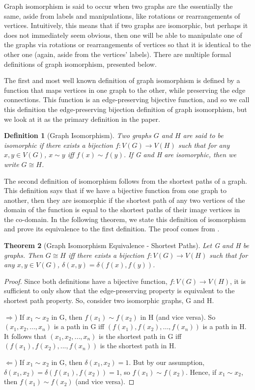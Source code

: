 \documentclass[12pt]{article}
\newtheorem{thm}{Theorem}[section]
\newtheorem{defn}[thm]{Definition}
\begin{document}
Graph isomorphism is said to occur when two graphs are the essentially
the same, aside from labels and manipulations, like rotations or
rearrangements of vertices. Intuitively, this means that if two graphs
are isomorphic, but perhaps it does not immediately seem obvious, then
one will be able to manipulate one of the graphs via rotations or
rearrangements of vertices so that it is identical to the other one
(again, aside from the vertices' labels). There are multiple formal
definitions of graph isomorphism, presented below.

The first and most well known definition of graph isomorphism is
defined by a function that maps vertices in one graph to the other,
while preserving the edge connections. This function is an
edge-preserving bijective function, and so we call this definition the
edge-preserving bijection definition of graph isomorphism, but we look
at it as the primary definition in the paper.

\begin{defn}[Graph Isomorphism]
  \label{def:ciso}
  Two graphs $G$ and $H$ are said to be isomorphic if there exists a
  bijection $f:V(G) \to V(H)$ such that for any $x, y \in V(G)$, $x
  \sim y$ iff $f(x) \sim f(y)$. If G and H are isomorphic, then we
  write $G \cong H$.
\end{defn}

The second definition of isomorphism follows from the shortest paths
of a graph. This definition says that if we have a bijective function
from one graph to another, then they are isomorphic if the shortest
path of any two vertices of the domain of the function is equal to the
shortest paths of their image vertices in the co-domain. In the
following theorem, we state this definition of isomorphism and prove
its equivalence to the first definition. The proof comes from
\cite{shortest}.

\begin{thm}[Graph Isomorphism Equivalence - Shortest Paths]
  \label{shortest}
  Let G and H be graphs. Then $G \cong H$ iff there exists a bijection
  $f:V(G) \to V(H)$ such that for any $x, y \in V(G)$, $\delta(x, y) =
  \delta(f(x), f(y))$.
\end{thm}

\begin{proof}
Since both definitions have a bijective function, $f:V(G) \to V(H)$,
it is sufficient to only show that the edge-preserving property is
equivalent to the shortest path property. So, consider two isomorphic
graphs, G and H.

$\Rightarrow$) If $x_1 \sim x_2$ in G, then $f(x_1) \sim f(x_2)$ in H
(and vice versa). So $(x_1, x_2, ..., x_n)$ is a path in G iff
$(f(x_1), f(x_2), ..., f(x_n))$ is a path in H. It follows that $(x_1,
x_2, ..., x_n)$ is the shortest path in G iff $(f(x_1), f(x_2), ...,
f(x_n))$ is the shortest path in H.

$\Leftarrow$) If $x_1 \sim x_2$ in G, then $\delta(x_1, x_2) = 1$. But
by our assumption, $\delta(x_1, x_2) = \delta(f(x_1), f(x_2)) = 1$, so
$f(x_1) \sim f(x_2)$. Hence, if $x_1 \sim x_2$, then $f(x_1) \sim
f(x_2)$ (and vice versa).
\end{proof}
\end{document}
